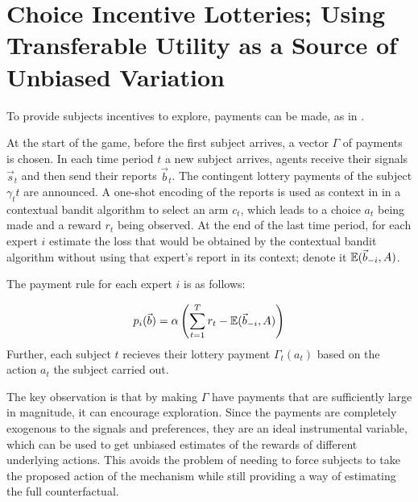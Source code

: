 
\section{Choice Incentive Lotteries;  Using Transferable Utility as a Source of Unbiased Variation}

To provide subjects incentives to explore, payments can be made, as in \citet{frazier2014incentivizing}. 


\begin{mech}

At the start of the game, before the first subject arrives, a vector $\Gamma$ of payments is chosen.
   In each time period $t$ a new subject arrives, agents receive their signals $\vec s_t$ and then send their reports $\vec b_{t}$. The contingent lottery payments of the subject $\gamma_{t}t$ are announced. A one-shot encoding of the reports is used as context in in a contextual bandit algorithm to select an arm $c_t$, which leads to a choice $a_t$ being made and a reward $r_t$ being observed.%
 At the end of the last time period, for each expert $i$ estimate the loss that would be obtained by the contextual bandit algorithm without using that expert's report in its context; denote it $\operatorname*{\mathbb E}({\vec b_{-i}},A)$.

The payment rule for each expert $i$ is as follows:

\[
   p_i(\vec b) =  \alpha \left(\sum_{t=1}^T r_{t} -  \operatorname*{\mathbb E}(\vec b_{-i},A)\right)
\]
   Further, each subject $t$ recieves their lottery payment $\Gamma_{t}(a_{t})$ based on the action $a_{t}$ the subject carried out.
\end{mech}

The key observation is that by making $\Gamma$ have payments that are sufficiently large in magnitude, it can encourage exploration.
Since the payments are completely exogenous to the signals and preferences, they are an ideal instrumental variable, which can be used to get unbiased estimates of the rewards of different underlying actions. %
This avoids the problem of needing to force subjects to take the proposed action of the mechanism while still providing a way of estimating the full counterfactual.


